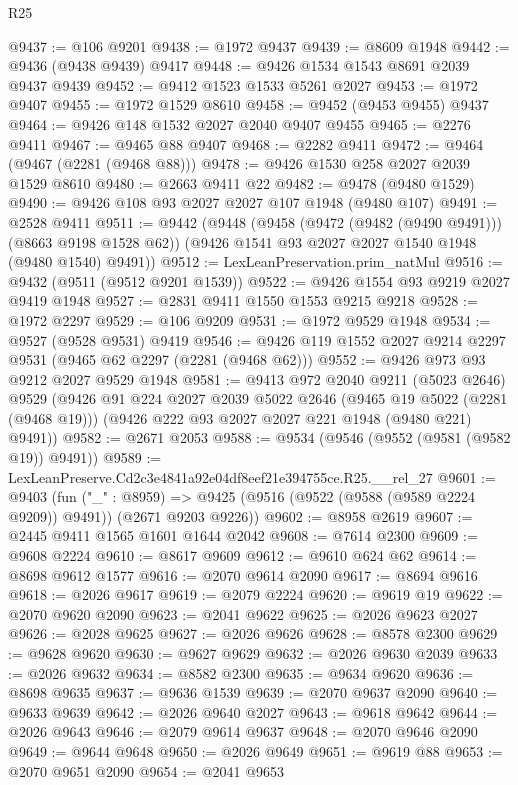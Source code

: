 \begin{lexlean}{R25}
\begin{coremodule}
@9437 := @106 @9201
@9438 := @1972 @9437
@9439 := @8609 @1948
@9442 := @9436 (@9438 @9439) @9417
@9448 := @9426 @1534 @1543 @8691 @2039 @9437 @9439
@9452 := @9412 @1523 @1533 @5261 @2027
@9453 := @1972 @9407
@9455 := @1972 @1529 @8610
@9458 := @9452 (@9453 @9455) @9437
@9464 := @9426 @148 @1532 @2027 @2040 @9407 @9455
@9465 := @2276 @9411
@9467 := @9465 @88 @9407
@9468 := @2282 @9411
@9472 := @9464 (@9467 (@2281 (@9468 @88)))
@9478 := @9426 @1530 @258 @2027 @2039 @1529 @8610
@9480 := @2663 @9411 @22
@9482 := @9478 (@9480 @1529)
@9490 := @9426 @108 @93 @2027 @2027 @107 @1948 (@9480 @107)
@9491 := @2528 @9411
@9511 := @9442
    (@9448
      (@9458 (@9472 (@9482 (@9490 @9491))) (@8663 @9198 @1528 @62))
      (@9426 @1541 @93 @2027 @2027 @1540 @1948 (@9480 @1540) @9491))
@9512 := LexLeanPreservation.prim_natMul
@9516 := @9432 (@9511 (@9512 @9201 @1539))
@9522 := @9426 @1554 @93 @9219 @2027 @9419 @1948
@9527 := @2831 @9411 @1550 @1553 @9215 @9218
@9528 := @1972 @2297
@9529 := @106 @9209
@9531 := @1972 @9529 @1948
@9534 := @9527 (@9528 @9531) @9419
@9546 := @9426 @119 @1552 @2027 @9214 @2297 @9531 (@9465 @62 @2297 (@2281 (@9468 @62)))
@9552 := @9426 @973 @93 @9212 @2027 @9529 @1948
@9581 := @9413
    @972
    @2040
    @9211
    (@5023 @2646)
    @9529
    (@9426
      @91
      @224
      @2027
      @2039
      @5022
      @2646
      (@9465 @19 @5022 (@2281 (@9468 @19)))
      (@9426 @222 @93 @2027 @2027 @221 @1948 (@9480 @221) @9491))
@9582 := @2671 @2053
@9588 := @9534 (@9546 (@9552 (@9581 (@9582 @19)) @9491))
@9589 := LexLeanPreserve.Cd2c3e4841a92e04df8eef21e394755ce.R25.__rel_27
@9601 := @9403
    (fun ("_" : @8959) =>
    @9425 (@9516 (@9522 (@9588 (@9589 @2224 @9209)) @9491)) (@2671 @9203 @9226))
@9602 := @8958 @2619
@9607 := @2445 @9411 @1565 @1601 @1644 @2042
@9608 := @7614 @2300
@9609 := @9608 @2224
@9610 := @8617 @9609
@9612 := @9610 @624 @62
@9614 := @8698 @9612 @1577
@9616 := @2070 @9614 @2090
@9617 := @8694 @9616
@9618 := @2026 @9617
@9619 := @2079 @2224
@9620 := @9619 @19
@9622 := @2070 @9620 @2090
@9623 := @2041 @9622
@9625 := @2026 @9623 @2027
@9626 := @2028 @9625
@9627 := @2026 @9626
@9628 := @8578 @2300
@9629 := @9628 @9620
@9630 := @9627 @9629
@9632 := @2026 @9630 @2039
@9633 := @2026 @9632
@9634 := @8582 @2300
@9635 := @9634 @9620
@9636 := @8698 @9635
@9637 := @9636 @1539
@9639 := @2070 @9637 @2090
@9640 := @9633 @9639
@9642 := @2026 @9640 @2027
@9643 := @9618 @9642
@9644 := @2026 @9643
@9646 := @2079 @9614 @9637
@9648 := @2070 @9646 @2090
@9649 := @9644 @9648
@9650 := @2026 @9649
@9651 := @9619 @88
@9653 := @2070 @9651 @2090
@9654 := @2041 @9653

\end{coremodule}
\end{lexlean}
